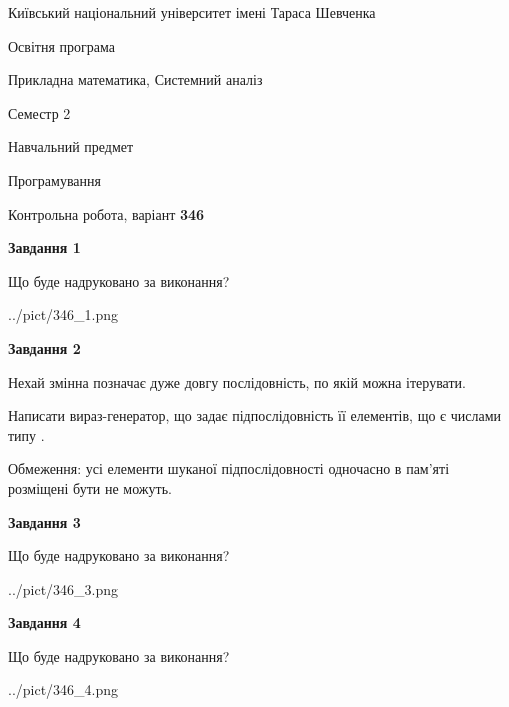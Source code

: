 \documentclass[12pt, ukrainian]{article}
\begin{document}
{{\begin {small}\par
{ \center  Київський національний університет імені Тараса Шевченка \par}
{\parbox {5 cm}{Освітня програма \hfill}{\parbox {8 cm}{Прикладна математика, Системний аналіз \hfill}}\parbox {5 cm}{\hfill Семестр 2}}\par
{\parbox {5 cm} {Навчальний предмет \hfill}\parbox {7 cm}{Програмування \hfill}\parbox {6cm}{\hfill}\par}\vspace{-7pt} \end{small}}{\center Контрольна робота, варіант  \No \textbf
{ 346 }\par}}
{
\begin {large}
{\begin {center}\textbf{Завдання 1}\end {center}}\par
Що буде надруковано за виконання?\par\par
\begin{center}
	{../pict/346_1.png}
\end{center}
\newpage

{\begin {center}\textbf{Завдання 2}\end {center}}\par
Нехай змінна  позначає дуже довгу послідовність, по якій можна ітерувати.

Написати вираз-генератор, що задає підпослідовність її елементів, що є числами типу .

Обмеження: усі елементи шуканої підпослідовності одночасно в пам'яті розміщені бути не можуть.\par
\newpage

{\begin {center}\textbf{Завдання 3}\end {center}}\par
Що буде надруковано за виконання?\par
\begin{center}
	{../pict/346_3.png}
\end{center}
\newpage

{\begin {center}\textbf{Завдання 4}\end {center}}\par
Що буде надруковано за виконання?\par
\begin{center}
	{../pict/346_4.png}
\end{center}
\newpage


\end{large}}
\end{document}
